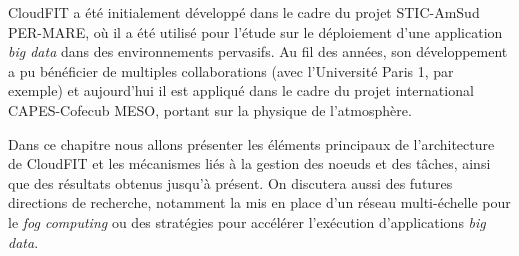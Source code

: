 \begin{resume}
	CloudFIT a été initialement développé dans le cadre du projet STIC-AmSud PER-MARE, où il a été utilisé pour l'étude sur le déploiement d'une application \textit{big data} dans des environnements pervasifs. Au fil des années, son développement a pu bénéficier de multiples collaborations (avec l'Université Paris 1, par exemple) et aujourd'hui il est appliqué dans le cadre du projet international CAPES-Cofecub MESO, portant sur la physique de l'atmosphère.

	
	
	
	Dans ce chapitre nous allons présenter les éléments principaux de l'architecture de CloudFIT et les mécanismes liés à la gestion des n{oe}uds et des tâches, ainsi que des résultats obtenus jusqu'à présent. On discutera aussi des futures directions de recherche, notamment la mis en place d'un réseau multi-échelle pour le \textit{fog computing} ou des stratégies pour accélérer l'exécution d'applications \textit{big data}. 
	

\end{resume}
